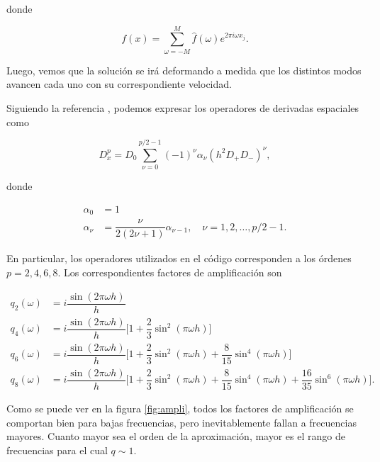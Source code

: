 \documentclass[12pt]{article}
\begin{document}
donde 

\begin{equation}
f(x) =  \sum_{\omega=-M}^M \hat{f}(\omega)  e^{2\pi i \omega x_j}.
\end{equation}

Luego, vemos que la soluci\'on se ir\'a deformando a medida que los distintos modos avancen cada uno con su correspondiente velocidad.

Siguiendo la referencia \cite{Gustafsson}, podemos expresar los operadores de derivadas espaciales como 

\begin{equation}
D_x^p = D_0 \sum_{\nu=0}^{p/2-1} (-1)^{\nu} \alpha_{\nu} (h^2 D_+ D_-)^{\nu},
\end{equation}

donde 

\begin{align*}
\alpha_0 &= 1 \\
\alpha_{\nu} &= \dfrac{\nu}{2(2\nu+1)} \alpha_{\nu-1}, \quad \nu = 1,2,\dots,p/2-1.
\end{align*}

En particular, los operadores utilizados en el c\'odigo corresponden a los \'ordenes $p=2, 4, 6, 8$. Los correspondientes factores de amplificaci\'on son

\begin{align}
q_2(\omega) &=i\dfrac{\sin (2\pi \omega h)}{h} \\
q_4(\omega) &=i\dfrac{\sin (2\pi \omega h)}{h} \bigg[ 1 + \dfrac{2}{3} \sin^2(\pi \omega h) \bigg] \\
q_6(\omega) &=i\dfrac{\sin (2\pi \omega h)}{h} \bigg[ 1 + \dfrac{2}{3} \sin^2(\pi \omega h) + \dfrac{8}{15}\sin^4(\pi \omega h) \bigg] \\
q_8(\omega) &=i\dfrac{\sin (2\pi \omega h)}{h} \bigg[ 1 + \dfrac{2}{3} \sin^2(\pi \omega h) + \dfrac{8}{15}\sin^4(\pi \omega h) + \dfrac{16}{35} \sin^6(\pi \omega h) \bigg].
\end{align}

Como se puede ver en la figura \ref{fig:ampli}, todos los factores de amplificaci\'on se comportan bien para bajas frecuencias, pero inevitablemente fallan a frecuencias mayores. Cuanto mayor sea el orden de la aproximaci\'on, mayor es el rango de frecuencias para el cual $q \sim 1$. 
\end{document}
